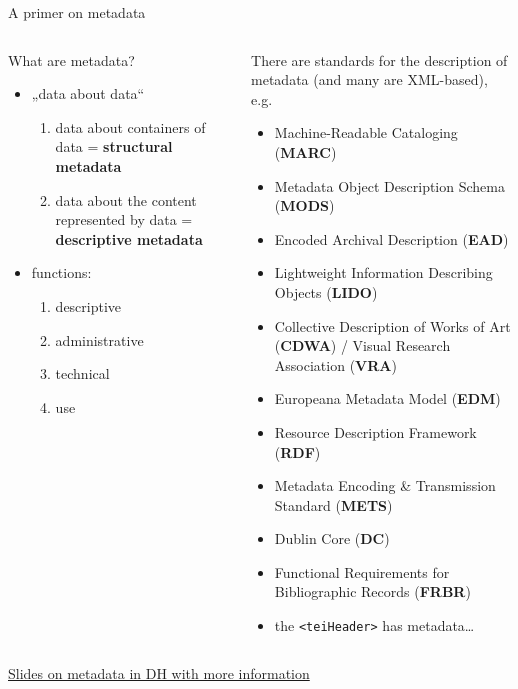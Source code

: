 \begin{frame}{A primer on metadata}
\small
\begin{columns}
\begin{block}{What are metadata?}
\begin{itemize}
\item „data about data“
\begin{enumerate}\footnotesize
\item data about containers of data = \textbf{structural metadata}
\item data about the content represented by data = \textbf{descriptive metadata}
\end{enumerate}
\item functions:
\begin{enumerate}\footnotesize
\item descriptive
\item administrative
\item technical
\item use
\end{enumerate}
\end{itemize}
\end{block}

\begin{block}{}
There are standards for the description of metadata (and many are XML-based), e.g.
\begin{itemize}\scriptsize
\item Machine-Readable Cataloging (\textbf{MARC})
\item Metadata Object Description Schema (\textbf{MODS})
\item Encoded Archival Description (\textbf{EAD})
\item Lightweight Information Describing Objects (\textbf{LIDO})
\item Collective Description of Works of Art (\textbf{CDWA}) / Visual Research Association (\textbf{VRA})
\item Europeana Metadata Model (\textbf{EDM})
\item Resource Description Framework (\textbf{RDF})
\item Metadata Encoding \& Transmission Standard (\textbf{METS})
\item Dublin Core (\textbf{DC})
\item Functional Requirements for Bibliographic Records (\textbf{FRBR})
\item the \texttt{<teiHeader>} has metadata\dots
\end{itemize}
\end{block}


\end{columns}
{\scriptsize \href{http://dixit.uni-koeln.de/wp-content/uploads/2015/04/Camp2-18-Georg_Vogeler_-_Metadata__talk.pdf}{Slides on metadata in DH with more information}}
\end{frame}

